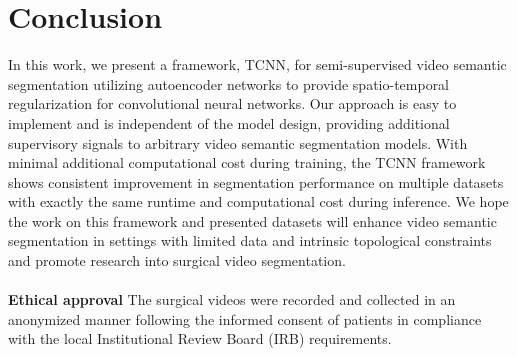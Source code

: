 \documentclass[twoside, print]{ieeecolor_arxiv}
\begin{document}
\section{Conclusion}
In this work, we present a framework, TCNN, for semi-supervised video semantic segmentation utilizing autoencoder networks to provide spatio-temporal regularization for convolutional neural networks. Our approach is easy to implement and is independent of the model design, providing additional supervisory signals to arbitrary video semantic segmentation models. With minimal additional computational cost during training, the TCNN framework shows consistent improvement in segmentation performance on multiple datasets with exactly the same runtime and computational cost during inference. We hope the work on this framework and presented datasets will enhance video semantic segmentation in settings with limited data and intrinsic topological constraints and promote
research into surgical video segmentation.
\\\\
{\bfseries Ethical approval} The surgical videos were recorded and collected in an anonymized manner following the informed consent of patients in compliance with the local Institutional Review Board (IRB) requirements. 



\end{document}
